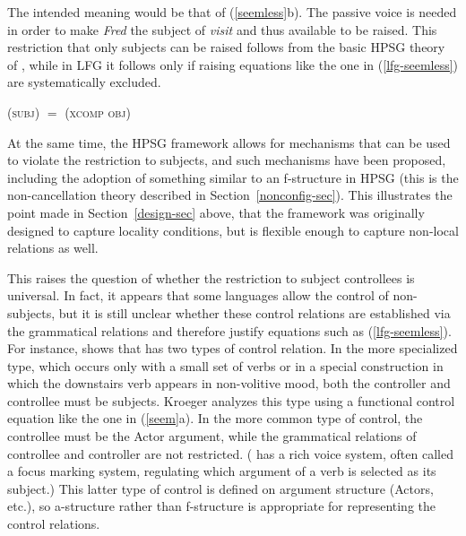 \begin{exe} 
\ex 
\label{seemless}
\begin{xlist}
\end{xlist}
\end{exe}
The intended meaning would be that of (\ref{seemless}b).  The passive voice is needed in order to make \textit{Fred} the subject of \textit{visit} and thus available to be raised.  This restriction that only subjects can be raised follows from the basic HPSG theory of \citet[132-145]{ps2}, while in LFG it follows only if raising equations like the one in (\ref{lfg-seemless}) are systematically excluded.
\begin{exe} 
\ex 
\label{lfg-seemless}
 {(\up \textsc{subj})  $=$  (\up \textsc{xcomp} \textsc{obj})}
\end{exe}
At the same time, the HPSG framework allows for mechanisms that can be used to violate the restriction to subjects, and such mechanisms have been proposed, including the adoption of something similar to an f-structure in HPSG (this is the non-cancellation theory described in Section~\ref{nonconfig-sec}).  This illustrates the point made in Section~\ref{design-sec} above, that the framework was originally designed to capture locality conditions, but is flexible enough to capture non-local relations as well.  

This raises the question of whether the restriction to subject controllees is universal. In fact, it appears that some languages allow the control of non-subjects, but it is still unclear whether these control relations are established via the grammatical relations and therefore justify equations such as (\ref{lfg-seemless}).  For instance, \citet{kroeger:1993} shows that  has two types of control relation.  In the more specialized type, which occurs only with a small set of verbs or in a special construction in which the downstairs verb appears in non-volitive mood, both the controller and controllee must be subjects.  Kroeger analyzes this type using a functional control equation like the one in (\ref{seem}a).  In the more common type of  control, the controllee must be the Actor argument, while the grammatical relations of controllee and controller are not restricted.  ( has a rich voice system, often called a focus marking system, regulating which argument of a verb is selected as its subject.)  This latter type of  control is defined on argument structure (Actors, etc.), so a-structure rather than f-structure is appropriate for representing the control relations.

